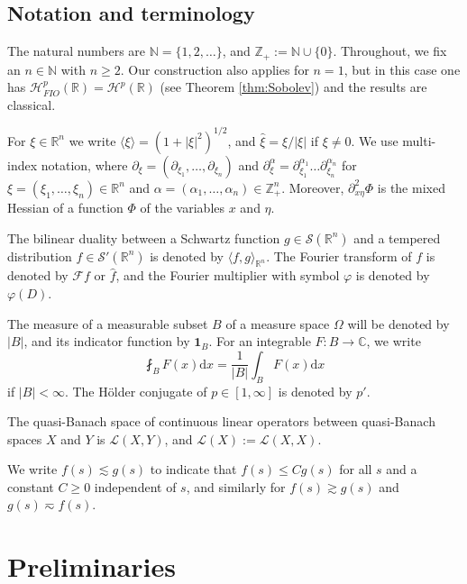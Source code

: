 \documentclass{amsart}
\newcommand {\C}{{\mathbb C}}
\newcommand {\ud}{\mathrm{d}}
\newcommand {\F}{\mathcal{F}}
\newcommand {\HT}{\mathcal{H}}
\newcommand {\ind}{\mathbf{1}}
\newcommand {\rb}{\rangle}
\newcommand {\lb}{\langle}
\newcommand {\La}{\mathcal{L}}
\newcommand {\N}{{\mathbb N}}
\newcommand {\ph}{\varphi}
\newcommand {\R}{\mathbb R}
\newcommand {\Rn}{\mathbb{R}^{n}}
\newcommand {\Sw}{\mathcal{S}}
\newcommand {\Z}{\mathbb Z}
\theoremstyle{definition}
\numberwithin{equation}{section}
\begin{document}
\subsection{Notation and terminology}\label{subsec:notation}

The natural numbers are $\N=\{1,2,\ldots\}$, and $\Z_{+}:=\N\cup\{0\}$. Throughout, we fix an $n\in\N$ with $n\geq 2$. Our construction also applies for $n=1$, but in this case one has $\HT^{p}_{FIO}(\R)=\HT^{p}(\R)$ (see Theorem \ref{thm:Sobolev}) and the results are classical. 

For $\xi\in\Rn$ we write $\lb\xi\rb=(1+|\xi|^{2})^{1/2}$, and $\hat{\xi}=\xi/|\xi|$ if $\xi\neq0$. We use multi-index notation, where $\partial_{\xi}=(\partial_{\xi_{1}},\ldots,\partial_{\xi_{n}})$ and $\partial^{\alpha}_{\xi}=\partial^{\alpha_{1}}_{\xi_{1}}\ldots\partial^{\alpha_{n}}_{\xi_{n}}$
for $\xi=(\xi_{1},\ldots,\xi_{n})\in\Rn$ and $\alpha=(\alpha_{1},\ldots,\alpha_{n})\in\Z_{+}^{n}$. Moreover, %
$\partial_{x\eta}^{2}\Phi$ is the mixed Hessian of a function $\Phi$ of the variables $x$ and $\eta$.

The bilinear duality between a Schwartz function $g\in\Sw(\Rn)$ and a tempered distribution $f\in\Sw'(\Rn)$ is denoted by $\lb f,g\rb_{\Rn}$. %
The Fourier transform of $f$ is denoted by $\F f$ or $\widehat{f}$, and the Fourier multiplier with symbol $\ph$ is denoted by $\ph(D)$. 

The measure of a measurable subset $B$ of a measure space $\Omega$ will be denoted by $|B|$, and its indicator function by $\ind_{B}$.  
For an integrable $F:B\to\C$, we write
\[
\fint_{B}F(x)\ud x=\frac{1}{|B|}\int_{B}F(x)\ud x
\]
if $|B|<\infty$. The H\"{o}lder conjugate of $p\in[1,\infty]$ is denoted by $p'$. 

The quasi-Banach space of continuous linear operators between quasi-Banach spaces $X$ and $Y$ is $\La(X,Y)$, 
and $\La(X):=\La(X,X)$. 

We write $f(s)\lesssim g(s)$ to indicate that $f(s)\leq C g(s)$ for all $s$ and a constant $C \geq0$ independent of $s$, and similarly for $f(s)\gtrsim g(s)$ and $g(s)\eqsim f(s)$.



\section{Preliminaries}\label{sec:preliminaries}
	
\end{document}
